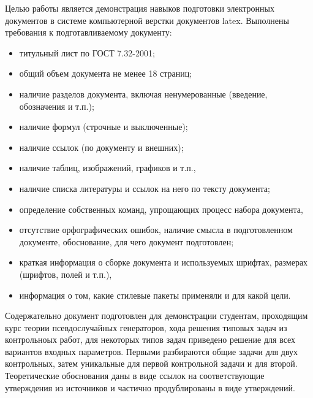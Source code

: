\Introduction

Целью работы является демонстрация навыков подготовки электронных документов в системе компьютерной верстки документов latex. Выполнены требования к подготавливаемому документу:

\begin{itemize}
\item титульный лист по ГОСТ 7.32-2001;
\item общий объем документа не менее 18 страниц;
\item наличие разделов документа, включая ненумерованные (введение, обозначения и т.п.);
\item наличие формул (строчные и выключенные);
\item наличие ссылок (по документу и внешних);
\item наличие таблиц, изображений, графиков и т.п.,
\item наличие списка литературы и ссылок на него по тексту документа;
\item определение собственных команд, упрощающих процесс набора документа,
\item отсутствие орфографических ошибок, наличие смысла в подготовленном документе,
обоснование, для чего документ подготовлен;
\item краткая информация о сборке документа и используемых шрифтах, размерах (шрифтов, полей и т.п.),
\item информация о том, какие стилевые пакеты применяли и для какой цели.
\end{itemize}

Содержательно документ подготовлен для демонстрации студентам, проходящим курс теории псевдослучайных генераторов, хода решения типовых задач из контрольноых работ, для некоторых типов задач приведено решение для всех вариантов входных параметров. Первыми разбираются общие задачи для двух контрольных, затем уникальные для первой контрольной задачи и для второй. Теоретические обоснования даны в виде ссылок на соответствующие утверждения из источников и частично продублированы в виде утверждений. 
